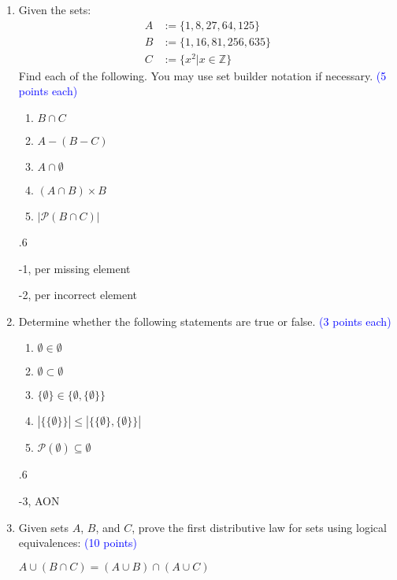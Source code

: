 \documentclass{article}
\newcommand{\pt}[1]{\textcolor{blue}{(#1 points)}}
\newcommand{\pte}[1]{\textcolor{blue}{(#1 points each)}}
\newenvironment{rubric}
{
\par
\begin{spacing}{.6}
\begin{itshape}
\color{red}

}
{
\end{itshape}
\end{spacing}
\par
}
\begin{document}
\clearpage
\begin{enumerate}
\item Given the sets: 
\begin{align*}
    A &:= \{1,8,27,64,125\}\\
    B &:= \{1,16,81,256,635\}\\
    C &:= \{x^2 | x \in \mathbb{Z}\}\
\end{align*}
Find each of the following. You may use set builder notation if necessary.
\pte 5

\begin{enumerate}
    \item $B \cap C$
    \item $A-(B-C)$
    \item $A \cap \emptyset$
    \item $(A \cap B) \times B$
    \item $|\mathcal{P}(B\cap C)|$
\end{enumerate}

\begin{rubric}
-1, per missing element

-2, per incorrect element

\end{rubric}

\item Determine whether the following statements are true or false. \pte{3}

\begin{enumerate}
    \item $\emptyset \in \emptyset$
    \item $\emptyset \subset \emptyset$
    \item $\{\emptyset\} \in \{\emptyset,\{\emptyset\}\}$
    \item $|\{\{\emptyset\}\}| \leq |\{\{\emptyset\}, \{\emptyset\}\}|$
    \item $\mathcal{P}(\emptyset) \subseteq \emptyset$
\end{enumerate}

\begin{rubric}
-3, AON
\end{rubric}

\item Given sets $A$, $B$, and $C$, prove the first distributive law for sets using logical equivalences:   \pt{10}
\begin{center}
    $A \cup (B \cap C) = (A \cup B) \cap (A \cup C)$
\end{center}


\end{enumerate}
\end{document}
